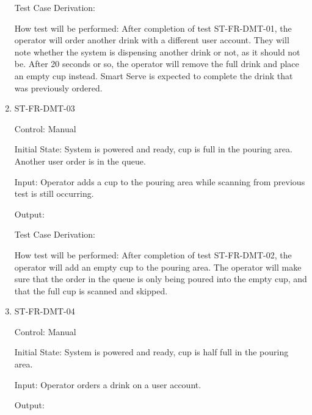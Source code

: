 \documentclass[12pt, titlepage]{article}
\begin{document}
\begin{enumerate}
Test Case Derivation: 

How test will be performed: After completion of test ST-FR-DMT-01, the operator will order another drink with a different user account. They will note whether the system is dispensing another drink or not, as it should not be. After 20 seconds or so, the operator will remove the full drink and place an empty cup instead. Smart Serve is expected to complete the drink that was previously ordered.

\item{ST-FR-DMT-03\\}

Control: Manual

Initial State: System is powered and ready, cup is full in the pouring area. Another user order is in the queue.

Input: Operator adds a cup to the pouring area while scanning from previous test is still occurring.

Output: 

Test Case Derivation: 

How test will be performed: After completion of test ST-FR-DMT-02, the operator will add an empty cup to the pouring area. The operator will make sure that the order in the queue is only being poured into the empty cup, and that the full cup is scanned and skipped.

\item{ST-FR-DMT-04\\}

Control: Manual

Initial State: System is powered and ready, cup is half full in the pouring area.

Input: Operator orders a drink on a user account.

Output: 


\end{enumerate}
\end{document}
